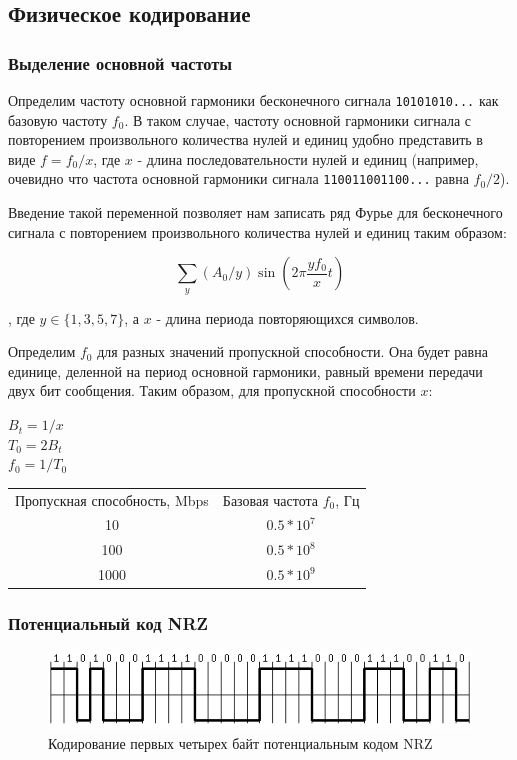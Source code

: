 \documentclass[12pt, a4paper]{article}
\begin{document}
\subsection*{Физическое кодирование}

\subsubsection*{Выделение основной частоты}

Определим частоту основной гармоники бесконечного сигнала \texttt{10101010...}
как базовую частоту $f_0$. В таком случае, частоту основной гармоники сигнала
с повторением произвольного количества нулей и единиц удобно представить в
виде $f = f_0 / x$, где $x$ - длина последовательности нулей и единиц (например,
очевидно что частота основной гармоники сигнала \texttt{110011001100...} равна
$f_0 / 2$).

Введение такой переменной позволяет нам записать ряд Фурье для бесконечного
сигнала с повторением произвольного количества нулей и единиц таким образом:

$$\sum_y (A_0 / y) \sin (2 \pi \frac{y f_0}{x} t)$$

, где $y \in \{ 1, 3, 5, 7 \}$, а $x$ - длина периода повторяющихся символов.

Определим $f_0$ для разных значений пропускной способности. Она будет равна
единице, деленной на период основной гармоники, равный времени передачи двух
бит сообщения. Таким образом, для пропускной способности $x$:

\newpage

\noindent $B_t = 1 / x$ \\
$T_0 = 2 B_t$ \\
$f_0 = 1 / T_0$ \\

\begin{tabular}{ c | c }
  Пропускная способность, Mbps & Базовая частота $f_0$, Гц \\
  10 & $0.5 * 10^7$ \\
  100 & $0.5 * 10^8$ \\
  1000 & $0.5 * 10^9$
\end{tabular}

\subsubsection*{Потенциальный код NRZ}

\begin{figure}[h]
  \begin{center}
    \includegraphics{nrz}
    \caption{Кодирование первых четырех байт потенциальным кодом NRZ}
  \end{center}
\end{figure}
\end{document}
